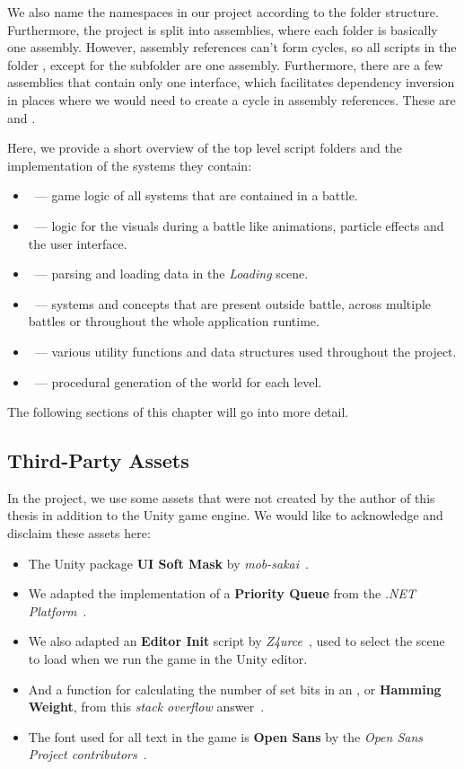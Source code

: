 We also name the namespaces in our project according to the folder structure.
Furthermore, the project is split into assemblies, where each folder is basically one assembly.
However, assembly references can't form cycles, so all scripts in the folder , except for the subfolder  are one assembly.
Furthermore, there are a few assemblies that contain only one interface, which facilitates dependency inversion in places where we would need to create a cycle in assembly references.
These are  and .

Here, we provide a short overview of the top level script folders and the implementation of the systems they contain:
\begin{itemize}
    \item {}~--- game logic of all systems that are contained in a battle.
    \item {}~--- logic for the visuals during a battle like animations, particle effects and the user interface.
    \item {}~--- parsing and loading data in the \emph{Loading} scene.
    \item {}~--- systems and concepts that are present outside battle, across multiple battles or throughout the whole application runtime.
    \item {}~--- various utility functions and data structures used throughout the project.
    \item {}~--- procedural generation of the world for each level.
\end{itemize}
The following sections of this chapter will go into more detail.

\subsection{Third-Party Assets}
In the project, we use some assets that were not created by the author of this thesis in addition to the Unity game engine.
We would like to acknowledge and disclaim these assets here:
\begin{itemize}
    \item The Unity package \textbf{UI Soft Mask} by \emph{mob-sakai}~\cite{SoftMask}.
    \item We adapted the implementation of a \textbf{Priority Queue} from the \emph{.NET Platform}~\cite{PriorityQueue}.
    \item We also adapted an \textbf{Editor Init} script by \emph{Z4urce}~\cite{EditorInit}, used to select the scene to load when we run the game in the Unity editor.
    \item And a function for calculating the number of set bits in an , or \textbf{Hamming Weight}, from this \emph{stack overflow} answer~\cite{PopCount}.
    \item The font used for all text in the game is \textbf{Open Sans} by the \emph{Open Sans Project contributors}~\cite{OpenSans}.
\end{itemize}

